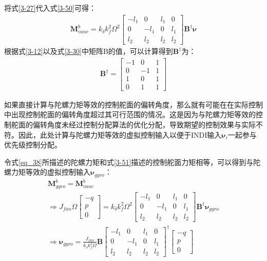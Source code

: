 将式\eqref{3-27}代入式\eqref{3-50}可得：
\begin{gather}
    \boldsymbol{M}_{vane}^b=k_{\delta}k_f^2\Omega^2\begin{bmatrix}
        -l_1 & 0 & l_1 & 0 \\
        0 & -l_1 & 0 & l_1 \\
        l_2 & l_2 & l_2 & l_2
        \end{bmatrix}\boldsymbol{B}^{\dagger}\boldsymbol{\nu}
    \label{3-51}
\end{gather}
根据式\eqref{3-12}以及式\eqref{3-30}中矩阵B的值，可以计算得到$\boldsymbol{B}^{\dagger}$为：
\begin{gather}
    \boldsymbol{B}^{\dagger}=
        \begin{bmatrix}
        -1 & 0 & 1 \\
        0 & -1 & 1  \\
        1 & 0 & 1 \\
        0 & 1 & 1
        \end{bmatrix}
    \label{3-52}
\end{gather}

如果直接计算与陀螺力矩等效的控制舵面的偏转角度，那么就有可能在在实际控制中出现控制舵面的偏转角度超过其可行范围的情况。这是因为与陀螺力矩等效的控制舵面的偏转角度未经过控制分配算法的优化分配，导致期望的控制效果与实际不符。因此，此处计算与陀螺力矩等效的虚拟控制输入以便于INDI输入$\boldsymbol{\nu}_i$一起参与优先级控制分配。

令式\eqref{eq_38}所描述的陀螺力矩和式\eqref{3-51}描述的控制舵面力矩相等，可以得到与陀螺力矩等效的虚拟控制输入$\boldsymbol{\nu}_{gyro}$：
\begin{equation}
    \begin{gathered}
        \boldsymbol{M}_{gyro}^b=\boldsymbol{M}_{vane}^b\\
        \Rightarrow J_{fan}\Omega\begin{bmatrix}-q \\ p \\ 0\end{bmatrix}
        =
        k_{\delta}k_f^2\Omega^2\begin{bmatrix}
            -l_1 & 0 & l_1 & 0 \\
            0 & -l_1 & 0 & l_1 \\
            l_2 & l_2 & l_2 & l_2
            \end{bmatrix}\boldsymbol{B}^{\dagger}\boldsymbol{\nu}_{gyro}\\
        \Rightarrow \boldsymbol{\nu}_{gyro}=\frac{J_{fan}}{k_{\delta}k_f^2\Omega}\boldsymbol{B}\begin{bmatrix}
            -l_1 & 0 & l_1 & 0 \\
            0 & -l_1 & 0 & l_1 \\
            l_2 & l_2 & l_2 & l_2
            \end{bmatrix}^{\dagger}\begin{bmatrix}-q \\ p \\ 0\end{bmatrix}
        \label{3-53}
    \end{gathered}
\end{equation}


